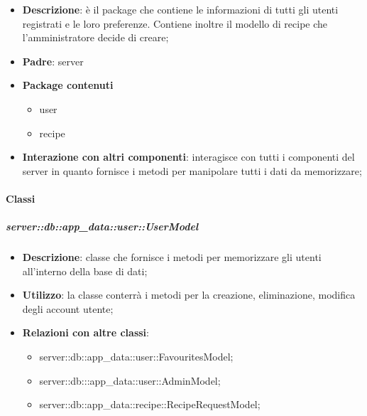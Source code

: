 	\begin{itemize}
		\item \textbf{Descrizione}: è il package che contiene le informazioni di tutti gli utenti registrati e le loro preferenze. Contiene inoltre il modello di recipe che l'amministratore decide di creare;
		\item \textbf{Padre}: server
		\item \textbf{Package contenuti}
			\begin{itemize}
				\item user
				\item recipe
			\end{itemize}
		\item \textbf{Interazione con altri componenti}: interagisce con tutti i componenti del server in quanto fornisce i metodi per manipolare tutti i dati da memorizzare;
	\end{itemize}


	\paragraph{Classi} %

		\subparagraph{server::db::app\_data::user::UserModel} %
		\label{subp:server_db_app_data_user_user_model}
			\begin{itemize}
				\item \textbf{Descrizione}: classe che fornisce i metodi per memorizzare gli utenti all'interno della base di dati;
				\item \textbf{Utilizzo}: la classe conterrà i metodi per la creazione, eliminazione, modifica degli account utente;
				\item \textbf{Relazioni con altre classi}:
					\begin{itemize}
						\item server::db::app\_data::user::FavouritesModel;
						\item server::db:::app\_data::user::AdminModel;
						\item server::db::app\_data::recipe::RecipeRequestModel;
					\end{itemize}
			\end{itemize}



